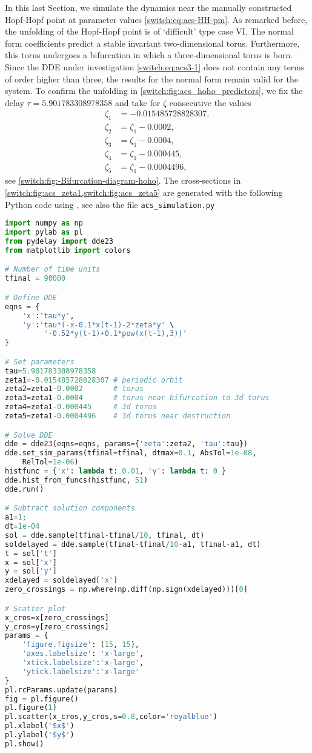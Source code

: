 In this last Section, we simulate the dynamics near the manually constructed Hopf-Hopf point at parameter values \cref{switch:eq:acs-HH-pm}. As remarked before, the unfolding of the Hopf-Hopf point  is of `difficult' type case VI. The normal form coefficients predict a stable invariant two-dimensional torus. Furthermore, this torus undergoes a bifurcation in which a three-dimensional torus is born. Since the DDE under investigation \cref{switch:eq:acs3-1} does not contain any terms of order higher than three, the results for the normal form remain valid for the system. To confirm the unfolding in  \cref{switch:fig:acs_hoho_predictors}, we fix the delay $\tau=5.901783308978358$ and take for $\zeta$ consecutive the values
\begin{align*}
\zeta_{1} & =-0.015485728828307,\\
\zeta_{2} & =\zeta_{1}-0.0002,\\
\zeta_{3} & =\zeta_{1}-0.0004,\\
\zeta_{4} & =\zeta_{1}-0.000445,\\
\zeta_{5} & =\zeta_{1}-0.0004496,
\end{align*}
see \cref{switch:fig:-Bifurcation-diagram-hoho}. The cross-sections in \cref{switch:fig:acs_zeta1,switch:fig:acs_zeta5} are generated with the following Python code using \PYDELAY, see also the file \lstinline|acs_simulation.py|
\begin{lstlisting}[language=Python]
import numpy as np
import pylab as pl
from pydelay import dde23
from matplotlib import colors

# Number of time units
tfinal = 90000

# Define DDE
eqns = {
    'x':'tau*y',
    'y':'tau*(-x-0.1*x(t-1)-2*zeta*y' \
         '-0.52*y(t-1)+0.1*pow(x(t-1),3))'
}

# Set parameters
tau=5.901783308978358
zeta1=-0.015485728828307 # periodic orbit
zeta2=zeta1-0.0002       # torus
zeta3=zeta1-0.0004       # torus near bifurcation to 3d torus
zeta4=zeta1-0.000445     # 3d torus
zeta5=zeta1-0.0004496    # 3d torus near destruction

# Solve DDE
dde = dde23(eqns=eqns, params={'zeta':zeta2, 'tau':tau})
dde.set_sim_params(tfinal=tfinal, dtmax=0.1, AbsTol=1e-08, 
	RelTol=1e-06)
histfunc = {'x': lambda t: 0.01, 'y': lambda t: 0 }
dde.hist_from_funcs(histfunc, 51)
dde.run()

# Subtract solution components
a1=1;
dt=1e-04
sol = dde.sample(tfinal-tfinal/10, tfinal, dt)
soldelayed = dde.sample(tfinal-tfinal/10-a1, tfinal-a1, dt)
t = sol['t']
x = sol['x']
y = sol['y']
xdelayed = soldelayed['x']
zero_crossings = np.where(np.diff(np.sign(xdelayed)))[0]

# Scatter plot
x_cros=x[zero_crossings]
y_cros=y[zero_crossings]
params = {
    'figure.figsize': (15, 15),
    'axes.labelsize': 'x-large',
    'xtick.labelsize':'x-large',
    'ytick.labelsize':'x-large'
}
pl.rcParams.update(params)
fig = pl.figure()
pl.figure(1)
pl.scatter(x_cros,y_cros,s=0.8,color='royalblue')
pl.xlabel('$x$')
pl.ylabel('$y$')
pl.show()
\end{lstlisting}

